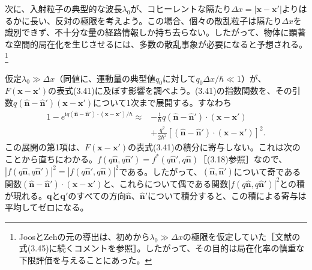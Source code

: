 \hypertarget{srcpage:130}{}\label{srcpage:130}
次に、入射粒子の典型的な波長$\lambda_0$が、コヒーレントな隔たり$\Delta x=|\bm x-\bm x'|$よりはるかに長い、反対の極限を考えよう。この場合、個々の散乱粒子は隔たり$\Delta x$を識別できず、不十分な量の経路情報しか持ち去らない。したがって、物体に顕著な空間的局在化を生じさせるには、多数の散乱事象が必要になると予想される。\footnote{JoosとZehの元の導出\cite{ref007}は、初めから$\lambda_0\gg\Delta x$の極限を仮定していた［文献\cite{ref007}の式(3.45)に続くコメントを参照］。したがって、その目的は局在化率の慎重な下限評価を与えることにあった。}

仮定$\lambda_0\gg\Delta x$（同値に、運動量の典型値$q_0$に対して$q_0\Delta x/\hbar\ll1$）が、$F(\bm x-\bm x')$の表式(3.41)に及ぼす影響を調べよう。(3.41)の指数関数を、その引数$q(\hat{\bm n}-\hat{\bm n}')(\bm x-\bm x')$について1次まで展開する。すなわち
\begin{equation}
\begin{aligned}
1-e^{\mathrm iq(\hat{\bm n}-\hat{\bm n}')\cdot(\bm x-\bm x')/\hbar}
\approx&-\frac{\mathrm i}{\hbar}q(\hat{\bm n}-\hat{\bm n}')\cdot(\bm x-\bm x')\\
&+\frac{q^2}{2\hbar^2}[(\hat{\bm n}-\hat{\bm n}')\cdot(\bm x-\bm x')]^2.
\end{aligned}\tag{3.49}
\end{equation}
この展開の第1項は、$F(\bm x-\bm x')$の表式(3.41)の積分に寄与しない。これは次のことから直ちにわかる。$f(q\hat{\bm n},q\hat{\bm n}')=f^*(q\hat{\bm n}',q\hat{\bm n})$［(3.18)参照］なので、$|f(q\hat{\bm n},q\hat{\bm n}')|^2=|f(q\hat{\bm n}',q\hat{\bm n})|^2$である。したがって、$(\hat{\bm n},\hat{\bm n}')$について奇である関数$(\hat{\bm n}-\hat{\bm n}')\cdot(\bm x-\bm x')$と、これらについて偶である関数$|f(q\hat{\bm n},q\hat{\bm n}')|^2$との積が現れる。$\bm q$と$\bm q'$のすべての方向$\hat{\bm n}$、$\hat{\bm n}'$について積分すると、この積による寄与は平均してゼロになる。

